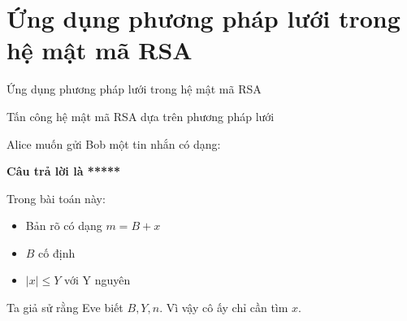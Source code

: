 \documentclass{beamer}
\numberwithin{equation}{section}
\begin{document}
\section{Ứng dụng phương pháp lưới trong hệ mật mã RSA}
\begin{frame}{Ứng dụng phương pháp lưới trong hệ mật mã RSA}

    \begin{block}{Tấn công hệ mật mã RSA dựa trên phương pháp    lưới}

        Alice muốn gửi Bob một tin nhắn có dạng:

        \textbf{Câu trả lời là *****}


        Trong bài toán này:

        \begin{itemize}
            \item   Bản   rõ  có dạng $m = B + x$
            \item   $B$ cố định
            \item   $|x| \leq Y$ với Y nguyên
        \end{itemize}
        
        
        
        
        
        Ta giả sử rằng Eve biết $B, Y, n$. Vì vậy cô ấy chỉ cần tìm $x$.
\end{block}








\end{frame}
\end{document}
